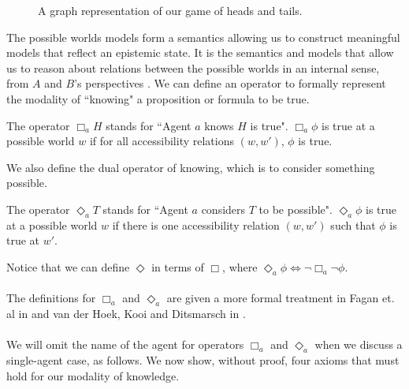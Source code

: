 \begin{figure}[ht!]
\centering
{}
\caption[Possible worlds game of heads and tails.]{A graph representation of our game of heads and tails.}\label{htkripkefigure}
\end{figure}

The possible worlds models form a semantics allowing us to construct meaningful
models that reflect an epistemic state.
It is the semantics and models that allow us to reason about relations between the possible worlds in
an internal sense, from $A$ and $B$'s perspectives \cite{blackburn2002modal}.
We can define an operator to formally represent the modality of ``knowing"
a proposition or formula to be true.

\begin{defn}
	The operator $\Box_a H$ stands for ``Agent $a$ knows $H$ is true".
	$\Box_a \phi$ is true at a possible world $w$ if for all accessibility relations $(w,
	w')$, $\phi$ is true.
\end{defn}

We also define the dual operator of knowing, which is to consider something
possible.

\begin{defn}
	The operator $\Diamond_a T$ stands for ``Agent $a$ considers $T$ to be possible".
	$\Diamond_a \phi$ is true at a possible world $w$ if there is one
	accessibility relation $(w,w')$ such that $\phi$ is true at $w'$.
\end{defn}

Notice that we can define $\Diamond$ in terms of $\Box$, where $\Diamond_a
\phi \iff \neg \Box_a \neg \phi$.\\
\\
The definitions for $\Box_a$ and $\Diamond_a$ are given a more formal treatment in
Fagan et. al in \cite{fagin1995reasoning} and van der Hoek, Kooi and Ditsmarsch in
\cite{hoek2008dynamic}.\\
\\
We will omit the name of the agent for operators $\Box_a$ and $\Diamond_a$ when we
discuss a single-agent case, as follows.
We now show, without proof, four axioms that must hold for our modality of
knowledge.

